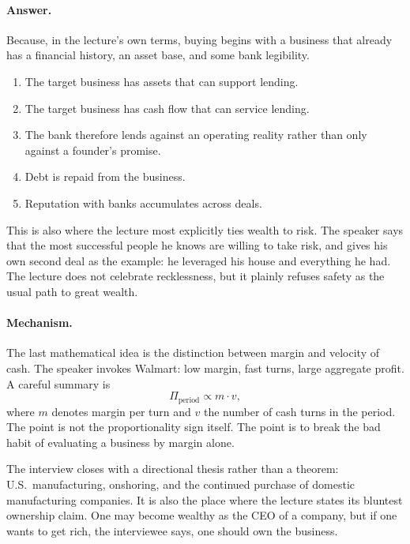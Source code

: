 \paragraph{Answer.} Because, in the lecture's own terms, buying begins with a business that already has a financial history, an asset base, and some bank legibility.

\begin{enumerate}
\item The target business has assets that can support lending.
\item The target business has cash flow that can service lending.
\item The bank therefore lends against an operating reality rather than only against a founder's promise.
\item Debt is repaid from the business.
\item Reputation with banks accumulates across deals.
\end{enumerate}

This is also where the lecture most explicitly ties wealth to risk. The speaker says that the most successful people he knows are willing to take risk, and gives his own second deal as the example: he leveraged his house and everything he had. The lecture does not celebrate recklessness, but it plainly refuses safety as the usual path to great wealth.

\paragraph{Mechanism.} The last mathematical idea is the distinction between margin and velocity of cash. The speaker invokes Walmart: low margin, fast turns, large aggregate profit. A careful summary is
\begin{equation}
\Pi_{\mathrm{period}} \propto m\cdot v,
\end{equation}
where \(m\) denotes margin per turn and \(v\) the number of cash turns in the period. The point is not the proportionality sign itself. The point is to break the bad habit of evaluating a business by margin alone.

The interview closes with a directional thesis rather than a theorem: U.S.\ manufacturing, onshoring, and the continued purchase of domestic manufacturing companies. It is also the place where the lecture states its bluntest ownership claim. One may become wealthy as the CEO of a company, but if one wants to get rich, the interviewee says, one should own the business.

